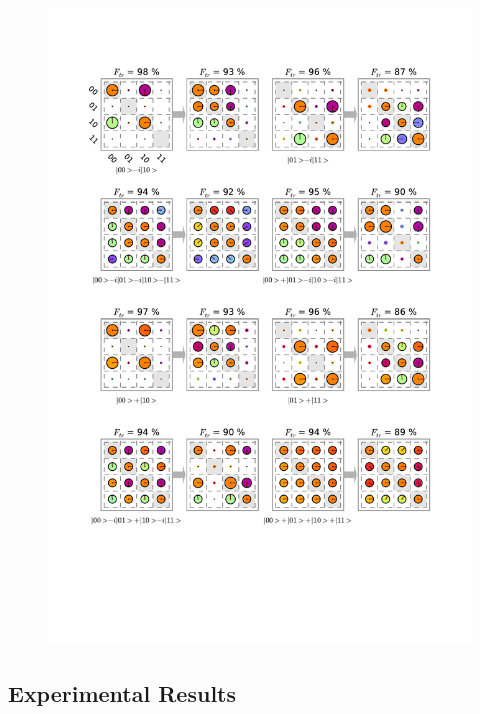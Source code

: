 \begin{figure}[p]
	\centering
		\includegraphics[width=1\textwidth]{"./data/ct5/2011_04_21 - grover and tomo/good_data/process -matrices 2"}
	\caption{}
	\label{fig:process_matrices_2}
\end{figure}

\subsection{Experimental Results}

